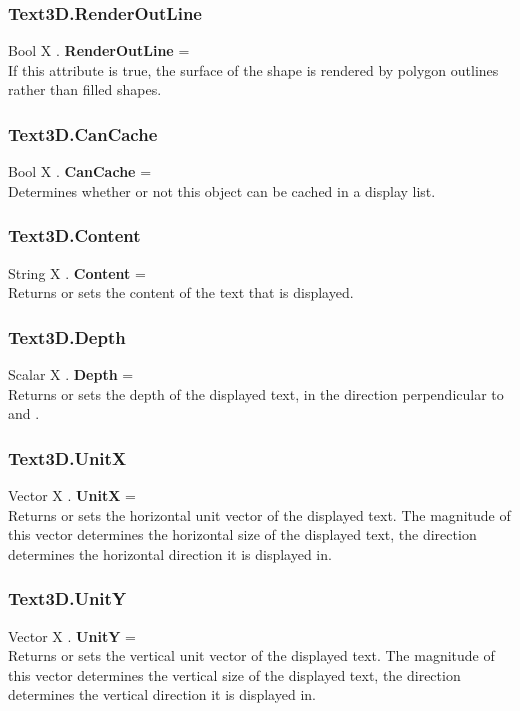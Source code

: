 \subsubsection{Text3D.RenderOutLine \label{F:Text3D:RenderOutLine}}
Bool X . \textbf{RenderOutLine} = \\
If this attribute is true, the surface of the shape is rendered by polygon outlines rather than filled shapes.

\subsubsection{Text3D.CanCache \label{F:Text3D:CanCache}}
Bool X . \textbf{CanCache} = \\
Determines whether or not this object can be cached in a display list.

\subsubsection{Text3D.Content \label{F:Text3D:Content}}
String X . \textbf{Content} = \\
Returns or sets the content of the text that is displayed.

\subsubsection{Text3D.Depth \label{F:Text3D:Depth}}
Scalar X . \textbf{Depth} = \\
Returns or sets the depth of the displayed text, in the direction perpendicular to  and .

\subsubsection{Text3D.UnitX \label{F:Text3D:UnitX}}
Vector X . \textbf{UnitX} = \\
Returns or sets the horizontal unit vector of the displayed text. The magnitude of this vector determines the horizontal size of the displayed text, the direction determines the horizontal direction it is displayed in.

\subsubsection{Text3D.UnitY \label{F:Text3D:UnitY}}
Vector X . \textbf{UnitY} = \\
Returns or sets the vertical unit vector of the displayed text. The magnitude of this vector determines the vertical size of the displayed text, the direction determines the vertical direction it is displayed in.

